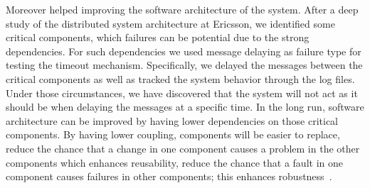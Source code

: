 Moreover \approach{} helped improving the software architecture of the system. 
After a deep study of the distributed system architecture at Ericsson, we identified some critical components, which failures can be potential due to the strong dependencies. For such dependencies we used message delaying as failure type for testing the timeout mechanism. %
Specifically, we delayed the messages between the critical components as well as tracked the system behavior through the log files. Under those circumstances, we have discovered that the system will not act as it should be when delaying the messages at a specific time. In the long run, software architecture can be improved by having lower dependencies on those critical components. By having lower coupling, components will be easier to replace, reduce the chance that a change in one component causes a problem in the other components which enhances reusability, reduce the chance that a fault in one component causes failures in other components; this  enhances robustness~\cite{software_arch}.  

